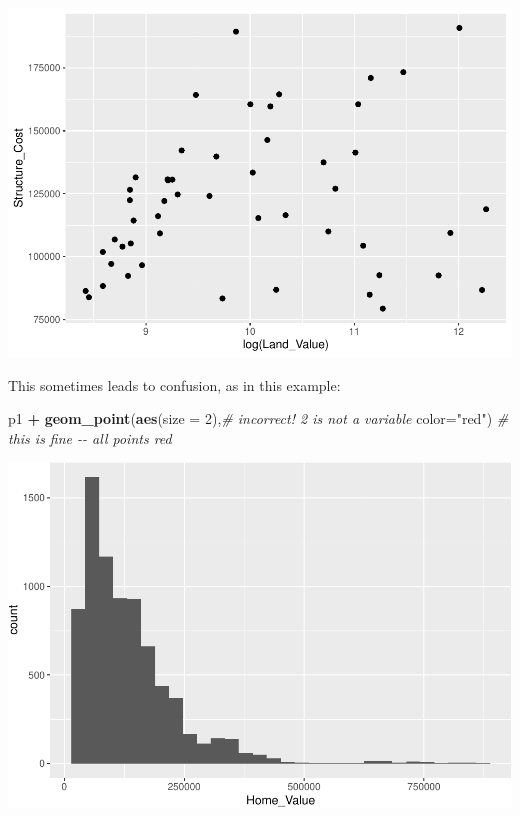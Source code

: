 \documentclass[
]{book}
\newenvironment{Shaded}{\begin{snugshade}}{\end{snugshade}}
\newcommand{\CommentTok}[1]{\textcolor[rgb]{0.56,0.35,0.01}{\textit{#1}}}
\newcommand{\DataTypeTok}[1]{\textcolor[rgb]{0.13,0.29,0.53}{#1}}
\newcommand{\DecValTok}[1]{\textcolor[rgb]{0.00,0.00,0.81}{#1}}
\newcommand{\KeywordTok}[1]{\textcolor[rgb]{0.13,0.29,0.53}{\textbf{#1}}}
\newcommand{\NormalTok}[1]{#1}
\newcommand{\OperatorTok}[1]{\textcolor[rgb]{0.81,0.36,0.00}{\textbf{#1}}}
\newcommand{\StringTok}[1]{\textcolor[rgb]{0.31,0.60,0.02}{#1}}
\begin{document}
\includegraphics{R/Rgraphics/figures/unnamed-chunk-162-1.pdf}

This sometimes leads to confusion, as in this example:

\begin{Shaded}
\begin{Highlighting}[]
\NormalTok{p1 }\OperatorTok{+}
\StringTok{  }\KeywordTok{geom\_point}\NormalTok{(}\KeywordTok{aes}\NormalTok{(}\DataTypeTok{size =} \DecValTok{2}\NormalTok{),}\CommentTok{\# incorrect! 2 is not a variable}
             \DataTypeTok{color=}\StringTok{"red"}\NormalTok{) }\CommentTok{\# this is fine {-}{-} all points red}
\end{Highlighting}
\end{Shaded}

\includegraphics{R/Rgraphics/figures/unnamed-chunk-163-1.pdf}
\end{document}

